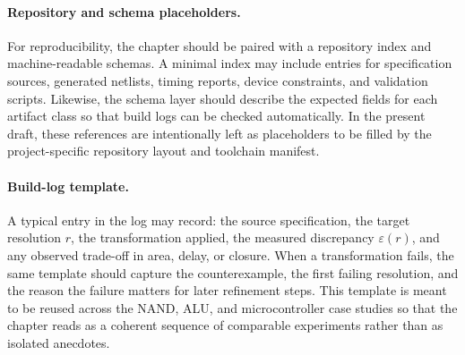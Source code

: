 \documentclass[11pt]{article}
\begin{document}
\paragraph{Repository and schema placeholders.}
For reproducibility, the chapter should be paired with a repository index and machine-readable schemas. A minimal index may include entries for specification sources, generated netlists, timing reports, device constraints, and validation scripts. Likewise, the schema layer should describe the expected fields for each artifact class so that build logs can be checked automatically. In the present draft, these references are intentionally left as placeholders to be filled by the project-specific repository layout and toolchain manifest.

\paragraph{Build-log template.}
A typical entry in the log may record: the source specification, the target resolution \(r\), the transformation applied, the measured discrepancy \(\varepsilon(r)\), and any observed trade-off in area, delay, or closure. When a transformation fails, the same template should capture the counterexample, the first failing resolution, and the reason the failure matters for later refinement steps. This template is meant to be reused across the NAND, ALU, and microcontroller case studies so that the chapter reads as a coherent sequence of comparable experiments rather than as isolated anecdotes.
\end{document}
